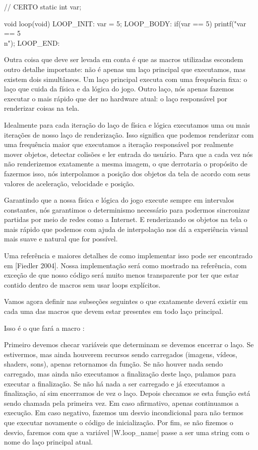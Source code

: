 \alinhaverbatim
// CERTO
static int var;

void loop(void){
LOOP\_INIT:
  var = 5;
LOOP\_BODY:
  if(var == 5)
    printf("var == 5\\n");
LOOP\_END:
}
\alinhanormal

Outra coisa que deve ser levada em conta é que as macros utilizadas
escondem outro detalhe importante: não é apenas um laço principal que
executamos, mas existem dois simultâneos. Um laço principal executa
com uma frequência fixa: o laço que cuida da física e da lógica do
jogo. Outro laço, nós apenas fazemos executar o mais rápido que der no
hardware atual: o laço responsável por renderizar coisas na tela.

Idealmente para cada iteração do laço de física e lógica executamos uma
ou mais iterações de nosso laço de renderização. Isso significa que
podemos renderizar com uma frequência maior que executamos a iteração
responsável por realmente mover objetos, detectar colisões e ler
entrada do usuário. Para que a cada vez nós não renderizemos
exatamente a mesma imagem, o que derrotaria o propósito de fazermos
isso, nós interpolamos a posição dos objetos da tela de acordo com
seus valores de aceleração, velocidade e posição.

Garantindo que a nossa física e lógica do jogo execute sempre em
intervalos constantes, nós garantimos o determinismo necessário para
podermos sincronizar partidas por meio de redes como a Internet. E
renderizando os objetos na tela o mais rápido que podemos com ajuda de
interpolação nos dá a experiência visual mais suave e natural que for
possível.

Uma referência e maiores detalhes de como implementar isso pode ser
encontrado em [Fiedler 2004]. Nossa implementação será como mostrado
na referência, com exceção de que nosso código será muito menos
transparente por ter que estar contido dentro de macros sem usar loops
explícitos.

Vamos agora definir nas subseções seguintes o que exatamente deverá
existir em cada uma das macros que devem estar presentes em todo laço
principal.


Isso é o que fará a macro :

Primeiro devemos checar variáveis que determinam se devemos encerrar o
laço. Se estivermos, mas ainda houverem recursos sendo carregados
(imagens, vídeos, shaders, sons), apenas retornamos da função. Se não
houver nada sendo carregado, mas ainda não executamos a finalização
deste laço, pulamos para executar a finalização. Se não há nada a ser
carregado e já executamos a finalização, aí sim encerramos de vez o
laço. Depois checamos se esta função está sendo chamada pela primeira
vez. Em caso afirmativo, apenas continuamos a execução. Em caso
negativo, fazemos um desvio incondicional para não termos que executar
novamente o código de inicialização. Por fim, se não fizemos o desvio,
faremos com que a variável |W.loop_name| passe a ser uma string com o
nome do laço principal atual.

